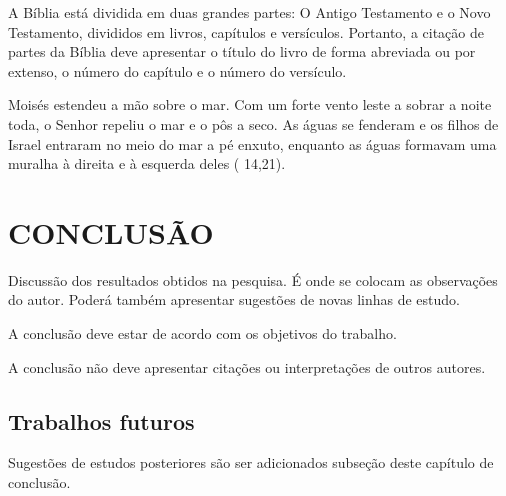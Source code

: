A Bíblia está dividida em duas grandes partes: O Antigo Testamento e o Novo Testamento, divididos em livros, capítulos e versículos. 
Portanto, a citação de partes da Bíblia deve apresentar o título do livro de forma abreviada ou por extenso, o número do capítulo e o número do versículo.


\begin{citacaodireta}
Moisés estendeu a mão sobre o mar. Com um forte \hspace{-0.1cm} vento \hspace{0.1cm} leste a \hspace{0.1cm}sobrar a
noite toda, o Senhor repeliu o mar e o pôs a seco. As águas se fenderam e
os filhos de Israel entraram no meio do mar a pé enxuto, enquanto as águas
formavam uma muralha à direita e à esquerda deles (\citeauthor{biblia} 14,21).
\end{citacaodireta}

\chapter{ CONCLUSÃO}

Discussão dos resultados obtidos na pesquisa. É onde se colocam as observações do autor. 
Poderá também apresentar sugestões de novas linhas de estudo.

A conclusão deve estar de acordo com os objetivos do trabalho.

A conclusão não deve apresentar citações ou interpretações de outros autores.

 \section{\esp Trabalhos futuros}
% 
 Sugestões de estudos posteriores são ser adicionados subseção deste capítulo de conclusão.
